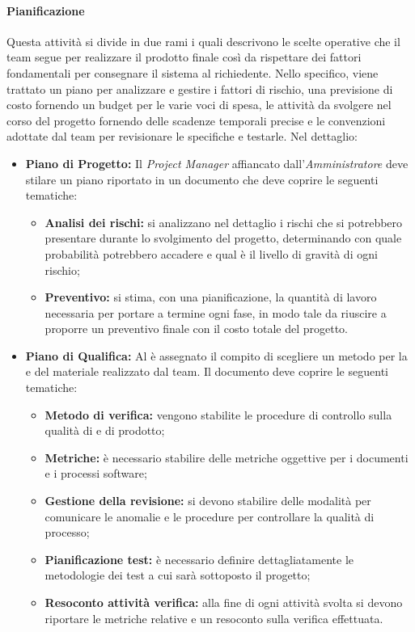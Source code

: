 	   \paragraph{Pianificazione} \Spazio
	   \label{sec:pianificazione}
	   Questa attività si divide in due rami i quali descrivono le scelte operative che il team segue per realizzare il prodotto finale così da rispettare dei fattori fondamentali per consegnare il sistema al richiedente. 
	   Nello specifico, viene trattato un piano per analizzare e gestire i fattori di rischio, una previsione di costo fornendo un budget per le varie voci di spesa, le attività da svolgere nel corso del progetto fornendo delle scadenze temporali precise e le convenzioni adottate dal team per revisionare le specifiche e testarle.
       Nel dettaglio:
       	       
	   \begin{itemize}
		\item \textbf{Piano di Progetto:} \Spazio
		Il \emph{Project Manager} affiancato dall'\emph{Amministratore} deve stilare un piano riportato in un documento che deve coprire le seguenti tematiche:
		\begin{itemize}
		\item \textbf{Analisi dei rischi:} si analizzano nel dettaglio i rischi che si potrebbero presentare durante lo svolgimento del progetto, determinando con quale probabilità potrebbero accadere e qual è il livello di gravità di ogni rischio;
		\item \textbf{Preventivo:} si stima, con una pianificazione, la quantità di lavoro necessaria per portare a termine ogni fase, in modo tale da riuscire a proporre un preventivo finale con il costo totale del progetto.
		\end{itemize}
		
		\item \textbf{Piano di Qualifica:} \Spazio
		Al \emph{} è assegnato il compito di scegliere un metodo per la  e  del materiale realizzato dal team.
		Il documento deve coprire le seguenti tematiche:
		\begin{itemize}
		\item \textbf{Metodo di verifica:} vengono stabilite le procedure di controllo sulla qualità di  e di prodotto;
		\item \textbf{Metriche:} è necessario stabilire delle metriche oggettive per i documenti e i processi software;
		\item \textbf{Gestione della revisione:} si devono stabilire delle modalità per comunicare le anomalie e le procedure per controllare la qualità di processo;
		\item \textbf{Pianificazione test:} è necessario definire dettagliatamente le metodologie dei test a cui sarà sottoposto il progetto;
		\item \textbf{Resoconto attività verifica:} alla fine di ogni attività svolta si devono riportare le metriche relative e un resoconto sulla verifica effettuata.
		\end{itemize}
	\end{itemize}
	
